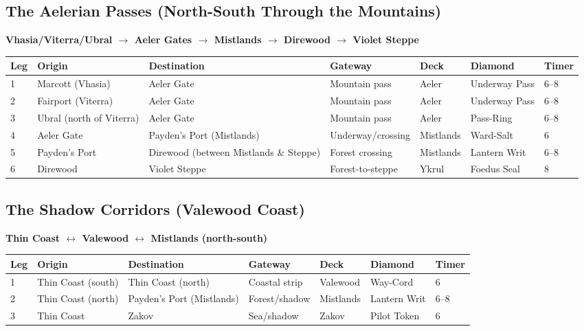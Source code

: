 \documentclass[12pt,oneside]{book}
\begin{document}
\subsection{The Aelerian Passes (North-South Through the Mountains)}

\textbf{Vhasia/Viterra/Ubral $\rightarrow$ Aeler Gates $\rightarrow$ Mistlands $\rightarrow$ Direwood $\rightarrow$ Violet Steppe}

\begin{longtable}{|p{1.5cm}|p{2.5cm}|p{2.5cm}|p{1.5cm}|p{2cm}|p{1.5cm}|}
\hline
\textbf{Leg} & \textbf{Origin} & \textbf{Destination} & \textbf{Gateway} & \textbf{Deck} & \textbf{Diamond} & \textbf{Timer} \\
 & Marcott (Vhasia) & Aeler Gate & Mountain pass & Aeler & Underway Pass & 6--8 \\
2 & Fairport (Viterra) & Aeler Gate & Mountain pass & Aeler & Underway Pass & 6--8 \\
3 & Ubral (north of Viterra) & Aeler Gate & Mountain pass & Aeler & Pass-Ring & 6--8 \\
4 & Aeler Gate & Payden's Port (Mistlands) & Underway/crossing & Mistlands & Ward-Salt & 6 \\
5 & Payden's Port & Direwood (between Mistlands \& Steppe) & Forest crossing & Mistlands & Lantern Writ & 6--8 \\
6 & Direwood & Violet Steppe & Forest-to-steppe & Ykrul & Foedus Seal & 8 \\
\hline
\end{longtable}

\subsection{The Shadow Corridors (Valewood Coast)}

\textbf{Thin Coast $\leftrightarrow$ Valewood $\leftrightarrow$ Mistlands (north-south)}

\begin{longtable}{|p{1.5cm}|p{2.5cm}|p{2.5cm}|p{1.5cm}|p{2cm}|p{1.5cm}|}
\hline
\textbf{Leg} & \textbf{Origin} & \textbf{Destination} & \textbf{Gateway} & \textbf{Deck} & \textbf{Diamond} & \textbf{Timer} \\
 & Thin Coast (south) & Thin Coast (north) & Coastal strip & Valewood & Way-Cord & 6 \\
2 & Thin Coast (north) & Payden's Port (Mistlands) & Forest/shadow & Mistlands & Lantern Writ & 6--8 \\
3 & Thin Coast & Zakov & Sea/shadow & Zakov & Pilot Token & 6 \\
\hline
\end{longtable}
\end{document}
